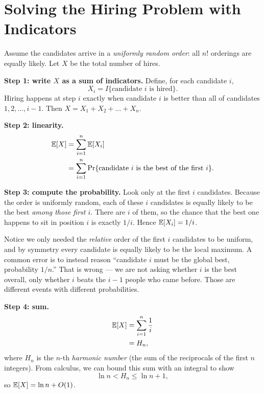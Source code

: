 \section{Solving the Hiring Problem with Indicators}
\label{ch05:hiring-solved}

Assume the candidates arrive in a \emph{uniformly random order}: all $n!$ orderings are equally likely. Let $X$ be the total number of hires.

\textbf{Step 1: write $X$ as a sum of indicators.} Define, for each candidate
$i$,
\[
  X_i = I\{\text{candidate } i \text{ is hired}\}.
\]
Hiring happens at step $i$ exactly when candidate $i$ is better than all of
candidates $1, 2, \dots, i-1$. Then $X = X_1 + X_2 + \dots + X_n$.

\textbf{Step 2: linearity.}
\begin{align*}
  \mathbb{E}[X] &= \sum_{i=1}^n \mathbb{E}[X_i] \\
        &= \sum_{i=1}^n \Pr\{\text{candidate } i \text{ is the best of the first } i\}.
\end{align*}

\textbf{Step 3: compute the probability.} Look only at the first $i$ candidates.
Because the order is uniformly random, each of these $i$ candidates is equally
likely to be the best \emph{among those first $i$}. There are $i$ of them, so the
chance that the best one happens to sit in position $i$ is exactly $1/i$. Hence
$\mathbb{E}[X_i] = 1/i$.

\begin{trapbox}
Notice we only needed the \emph{relative} order of the first $i$ candidates to be
uniform, and by symmetry every candidate is equally likely to be the local
maximum. A common error is to instead reason ``candidate $i$ must be the global
best, probability $1/n$.'' That is wrong --- we are not asking whether $i$ is the
best overall, only whether $i$ beats the $i-1$ people who came before. Those are
different events with different probabilities.
\end{trapbox}

\textbf{Step 4: sum.}
\begin{align*}
  \mathbb{E}[X] &= \sum_{i=1}^n \frac{1}{i} \\
        &= H_n,
\end{align*}
where $H_n$ is the $n$-th \emph{harmonic number} (the sum of the reciprocals of the first $n$ integers). From calculus, we can bound this sum with an integral to show
\[
  \ln n < H_n \le \ln n + 1,
\]
so $\mathbb{E}[X] = \ln n + O(1)$.

